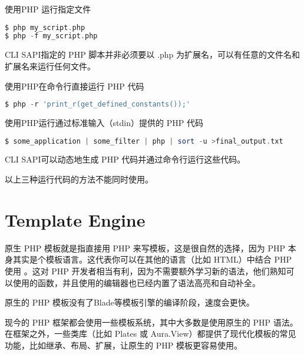 \begin{compactenum}
\item 使用PHP 运行指定文件


\begin{lstlisting}[language=PHP]
$ php my_script.php
$ php -f my_script.php
\end{lstlisting}

CLI SAPI指定的 PHP 脚本并非必须要以 .php 为扩展名，可以有任意的文件名和扩展名来运行任何文件。

\item 使用PHP在命令行直接运行 PHP 代码

\begin{lstlisting}[language=PHP]
$ php -r 'print_r(get_defined_constants());'
\end{lstlisting}

\item 使用PHP运行通过标准输入（stdin）提供的 PHP 代码


\begin{lstlisting}[language=PHP]
$ some_application | some_filter | php | sort -u >final_output.txt
\end{lstlisting}


CLI SAPI可以动态地生成 PHP 代码并通过命令行运行这些代码。

\end{compactenum}

以上三种运行代码的方法不能同时使用。




\section{Template Engine}

原生 PHP 模板就是指直接用 PHP 来写模板，这是很自然的选择，因为 PHP 本身其实是个模板语言。这代表你可以在其他的语言（比如 HTML）中结合 PHP 使用 。这对 PHP 开发者相当有利，因为不需要额外学习新的语法，他们熟知可以使用的函数，并且使用的编辑器也已经内置了语法高亮和自动补全。

原生的 PHP 模板没有了Blade等模板引擎的编译阶段，速度会更快。

现今的 PHP 框架都会使用一些模板系统，其中大多数是使用原生的 PHP 语法。在框架之外，一些类库（比如 Plates 或 Aura.View）都提供了现代化模板的常见功能，比如继承、布局、扩展，让原生的 PHP 模板更容易使用。

